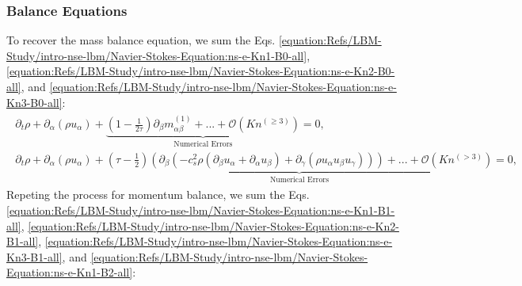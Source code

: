 \documentclass[letterpaper,10pt,english,openany,oneside]{jupyterBook}
\begin{document}
\subsubsection{Balance Equations}
\label{\detokenize{Refs/LBM-Study/intro-nse-lbm/Navier-Stokes-Equation:balance-equations}}
\sphinxAtStartPar
To recover the mass balance equation, we sum the Eqs. \eqref{equation:Refs/LBM-Study/intro-nse-lbm/Navier-Stokes-Equation:ns-e-Kn1-B0-all}, \eqref{equation:Refs/LBM-Study/intro-nse-lbm/Navier-Stokes-Equation:ns-e-Kn2-B0-all}, and \eqref{equation:Refs/LBM-Study/intro-nse-lbm/Navier-Stokes-Equation:ns-e-Kn3-B0-all}:
\begin{equation*}
\begin{split}
\begin{array}{l}
\partial_{t} \rho + \partial_{\alpha} (\rho u_{\alpha}) + \underbrace{ \left(1-\displaystyle\frac{1}{2\tau}\right) \partial_\beta m^{(1)}_{\alpha\beta} + ... + \mathcal{O}(Kn^{(\geq 3)}) }_{\textrm{Numerical Errors}} =0,\\
\partial_{t} \rho + \partial_{\alpha} (\rho u_{\alpha}) + \underbrace{ \left(\tau-\displaystyle\frac{1}{2}\right) \left(\partial_\beta (-c_{s}^{2} \rho\left(\partial_{\beta} u_{\alpha} + \partial_{\alpha} u_{\beta} \right) + \partial_{\gamma} (\rho u_{\alpha}u_{\beta}u_{\gamma}))\right) + ... + \mathcal{O}(Kn^{(> 3)}) }_{\textrm{Numerical Errors}} =0,
\end{array}
\end{split}
\end{equation*}
\sphinxAtStartPar
Repeting the process for momentum balance, we sum the Eqs. \eqref{equation:Refs/LBM-Study/intro-nse-lbm/Navier-Stokes-Equation:ns-e-Kn1-B1-all}, \eqref{equation:Refs/LBM-Study/intro-nse-lbm/Navier-Stokes-Equation:ns-e-Kn2-B1-all}, \eqref{equation:Refs/LBM-Study/intro-nse-lbm/Navier-Stokes-Equation:ns-e-Kn3-B1-all}, and \eqref{equation:Refs/LBM-Study/intro-nse-lbm/Navier-Stokes-Equation:ns-e-Kn1-B2-all}:
\end{document}
